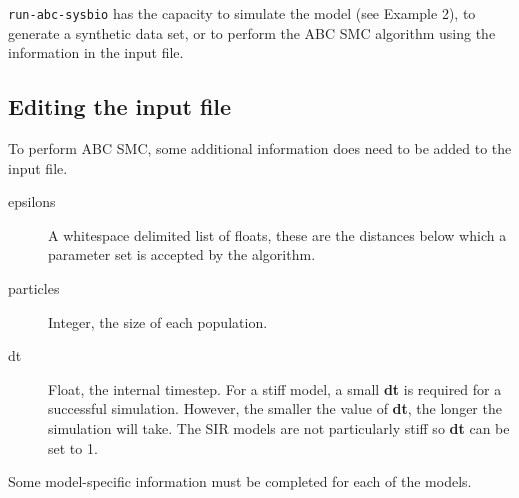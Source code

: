\documentclass[a4paper]{report}
\begin{document}
\verb$run-abc-sysbio$ has the capacity to simulate the model (see Example 2), to generate a synthetic data set, or to perform the ABC SMC algorithm using the information in the input file.

\subsection{Editing the input file}
To perform ABC SMC, some additional information does need to be added to the input file.
\begin{description}
\item[epsilons] A whitespace delimited list of floats, these are the distances below which a parameter set is accepted by the algorithm.
\item[particles] Integer, the size of each population. 
\item[dt] Float, the internal timestep. For a stiff model, a small \textbf{dt} is required for a successful simulation. However, the smaller the value of \textbf{dt}, the longer the simulation will take. The SIR models are not particularly stiff so \textbf{dt} can be set to 1.
\end{description}
Some model-specific information must be completed for each of the models.
\end{document}

